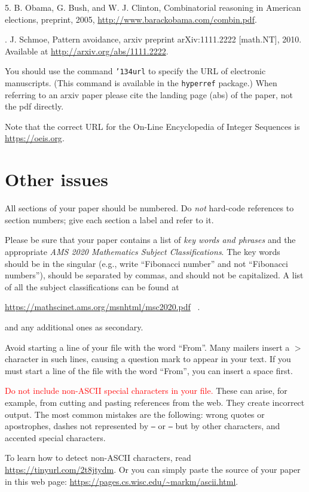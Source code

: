 \documentclass[12pt]{article}
\begin{document}
     5.  B. Obama, G. Bush, and W. J. Clinton,
     Combinatorial reasoning in American elections,
	 preprint, 2005,  \url{http://www.barackobama.com/combin.pdf}.

\medskip

.  J. Schmoe, Pattern avoidance, arxiv preprint arXiv:1111.2222 [math.NT], 2010. Available at \url{http://arxiv.org/abs/1111.2222}.

\smallskip

You should use the command {\tt \char'134url} to specify the URL of
electronic manuscripts.  (This command is available in
the {\tt hyperref} package.)  When referring to an arxiv paper please
cite the landing page (abs) of the paper, not the pdf directly.

Note that the correct URL for the On-Line
Encyclopedia of Integer Sequences is \url{https://oeis.org}.

\section{Other issues}

All sections of your paper should be numbered.  Do {\it not\/}
hard-code references to section numbers; give each section a label
and refer to it.

Please be sure that your paper contains a list of {\it key words and
phrases} and the appropriate {\it AMS 2020 Mathematics Subject
Classifications}.  The key words should be in the singular (e.g., write
``Fibonacci number'' and not ``Fibonacci numbers''), should be separated
by commas, and should not be capitalized.
A list of all the subject
classifications can be found at\newline
\centerline{\url{https://mathscinet.ams.org/msnhtml/msc2020.pdf} \ .}

 and any additional ones as secondary.

Avoid starting a line of your file  with the word ``From''.  Many mailers
insert a $>$ character in such lines, causing a question mark to appear
in your text.  If you must start a line of the file with the
word ``From'', you can insert a space first.

\textcolor{red}{Do not include non-ASCII special characters in your file.}  These can arise,
for example, from cutting and pasting references from the web.  They
create incorrect output.
The most common mistakes are the following:  wrong quotes or apostrophes,
dashes not represented by
{\tt --} or {\tt ---} but by other characters, and accented special
characters.

To learn how to detect non-ASCII characters, read \\
\url{https://tinyurl.com/2t8jtydm}.  Or you can simply paste the source
of your paper in this web page:  \url{https://pages.cs.wisc.edu/~markm/ascii.html}.
\end{document}
